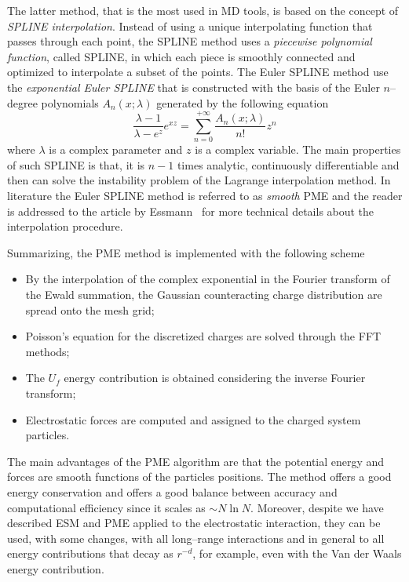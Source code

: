 The latter method, that is the most used in \ac{MD} tools, is based on the concept of \textit{SPLINE 
interpolation}. Instead of using a unique interpolating function that passes through each point, the SPLINE 
method uses a \textit{piecewise polynomial function}, called SPLINE, in which each piece is smoothly connected 
and optimized to interpolate a subset of the points. The Euler SPLINE method use the \textit{exponential Euler 
SPLINE} that is constructed with the basis of the Euler $n$--degree polynomials $A_n(x;\lambda)$ generated by the 
following equation
\begin{equation*}
	\frac{\lambda - 1}{\lambda - e^z}e^{xz} = \sum_{n=0}^{+\infty} \frac{A_n(x;\lambda)}{n!}z^n
\end{equation*}
where $\lambda$ is a complex parameter and $z$ is a complex variable. The main properties of such SPLINE is that, 
it is $n-1$ times analytic, continuously differentiable and then can solve the instability problem of the 
Lagrange interpolation method. In literature the Euler SPLINE method is referred to as \textit{smooth} \ac{PME} 
and the reader is addressed to the article by Essmann \etal\, \cite{EssmannSPME} for more technical details about 
the interpolation procedure.

Summarizing, the \ac{PME} method is implemented with the following scheme
\begin{itemize}
	\item By the interpolation of the complex exponential in the Fourier transform of the Ewald summation, the 
		  Gaussian counteracting charge distribution are spread onto the mesh grid;
	\item Poisson's equation for the discretized charges are solved through the \ac{FFT} methods;
	\item The $U_f$ energy contribution is obtained considering the inverse Fourier transform;
	\item Electrostatic forces are computed and assigned to the charged system particles.
\end{itemize}

The main advantages of the \ac{PME} algorithm are that the potential energy and forces are smooth functions of 
the particles positions. The method offers a good energy conservation and offers a good balance between accuracy 
and computational efficiency since it scales as $\sim N\ln N$. Moreover, despite we have described \ac{ESM} and 
\ac{PME} applied to the electrostatic interaction, they can be used, with some changes, with all long--range 
interactions and in general to all energy contributions that decay as $r^{-d}$, for example, even with the Van 
der Waals energy contribution.

